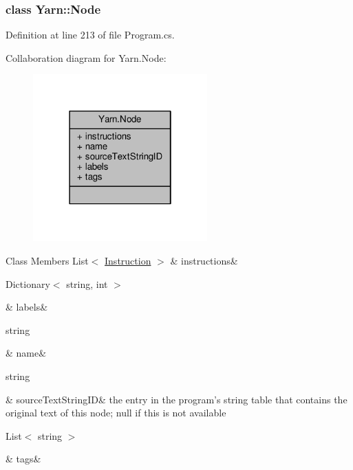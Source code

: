 \subsubsection{class Yarn\-:\-:Node}


Definition at line 213 of file Program.\-cs.



Collaboration diagram for Yarn.\-Node\-:
\nopagebreak
\begin{figure}[H]
\begin{center}
\leavevmode
\includegraphics[width=190pt]{a00364}
\end{center}
\end{figure}
\begin{DoxyFields}{Class Members}
\hypertarget{a00048_a156723a9252b62d288ddf611939ea7c3}{List$<$ \hyperlink{a00113}{Instruction} $>$}\label{a00048_a156723a9252b62d288ddf611939ea7c3}
&
instructions&
\\
\hline

\hypertarget{a00048_a9afa49f4fbc72e806a0210cb4198f12e}{Dictionary$<$ string, int $>$}\label{a00048_a9afa49f4fbc72e806a0210cb4198f12e}
&
labels&
\\
\hline

\hypertarget{a00048_a107b0de3fcfc65e99913edc01b5ce9db}{string}\label{a00048_a107b0de3fcfc65e99913edc01b5ce9db}
&
name&
\\
\hline

\hypertarget{a00048_a09c6af5b50925d0876283b84281b3ed4}{string}\label{a00048_a09c6af5b50925d0876283b84281b3ed4}
&
source\-Text\-String\-I\-D&
the entry in the program's string table that contains the original text of this node; null if this is not available \\
\hline

\hypertarget{a00048_a811086feceebbe79a74eba071c1d516b}{List$<$ string $>$}\label{a00048_a811086feceebbe79a74eba071c1d516b}
&
tags&
\\
\hline

\end{DoxyFields}



